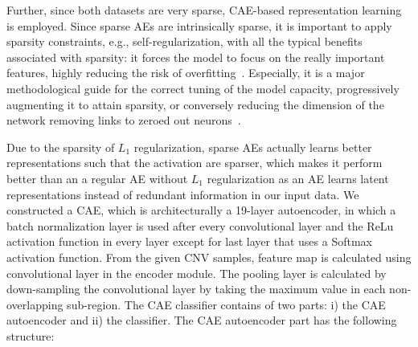 \hspace*{3.5mm} Further, since both datasets are very sparse,  CAE-based representation learning is employed. Since sparse AEs are intrinsically sparse, it is important to apply sparsity constraints, e.g., self-regularization, with all the typical benefits associated with sparsity: it forces the model to focus on the really important features, highly reducing the risk of overfitting~\cite{karimBIB2019}. Especially, it is a major methodological guide for the correct tuning of the model capacity, progressively augmenting it to attain sparsity, or conversely reducing the dimension of the network removing links to zeroed out neurons~\cite{sparseAE}. 

\hspace*{3.5mm} Due to the sparsity of $L_1$ regularization, sparse AEs actually learns better representations such that the activation are sparser, which makes it perform better than an a regular AE without $L_1$ regularization as an AE learns latent representations instead of redundant information in our input data. 
We constructed a CAE, which is architecturally a 19-layer autoencoder, in which a batch normalization layer is used after every convolutional layer and the ReLu activation function in every layer except for last layer that uses a Softmax activation function. From the given CNV samples, feature map is calculated using convolutional layer in the encoder module. The pooling layer is calculated by down-sampling the convolutional layer by taking the maximum value in each non-overlapping sub-region. The CAE classifier contains of two parts: i) the CAE autoencoder and ii) the classifier. The CAE autoencoder part has the following structure: 

